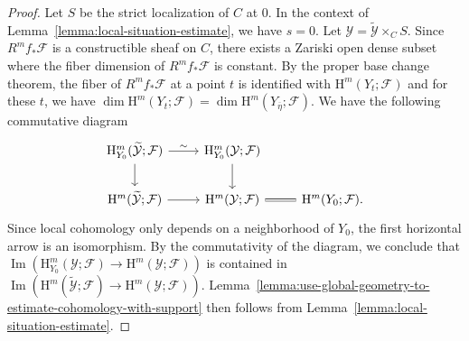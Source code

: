 \documentclass[english]{smfart}
\theoremstyle{remark}
\theoremstyle{plain}
\theoremstyle{definition}
\numberwithin{equation}{remark}
\theoremstyle{void}
\begin{document}
\begin{proof}
Let \(S\) be the strict localization of \(C\) at \(0\).  In the
context of Lemma~\ref{lemma:local-situation-estimate}, we have
\(s = 0\).  Let \(\mathcal{Y} = \widetilde{\mathcal{Y}}\times_{C} S\).  Since
\(R^{m}f_{\ast}\mathcal{F}\) is a constructible sheaf on \(C\), there
exists a Zariski open dense subset where the fiber dimension of
\(R^{m}f_{\ast}\mathcal{F}\) is constant.  By the proper base change
theorem, the fiber of \(R^{m}f_{\ast}\mathcal{F}\) at a point \(t\) is
identified with \(\mathrm{H}^m(Y_{t};\mathcal{F})\) and for these \(t\), we have
\(\dim\mathrm{H}^m(Y_t;\mathcal{F})=\dim\mathrm{H}^m(Y_{\overline{\eta}};\mathcal{F})\).
We have the following commutative diagram
\begin{equation*}
\begin{tikzcd}
\mathrm{H}^m_{Y_{0}}(\widetilde{\mathcal{Y}};\mathcal{F}) \ar[r,"\sim"] \ar[d] & \mathrm{H}^m_{Y_0}(\mathcal{Y};\mathcal{F}) \ar[d] \\
\mathrm{H}^m(\widetilde{\mathcal{Y}};\mathcal{F}) \ar[r] & \mathrm{H}^m(\mathcal{Y};\mathcal{F}) \ar[r,equal] & \mathrm{H}^m(Y_{0};\mathcal{F}).
\end{tikzcd}
\end{equation*}
Since local cohomology only depends on a neighborhood of \(Y_0\),
the first horizontal arrow is an isomorphism.  By the commutativity
of the diagram, we conclude that
\(\operatorname{Im}(\mathrm{H}^m_{Y_0}(\mathcal{Y};\mathcal{F}) \to \mathrm{H}^m(\mathcal{Y};\mathcal{F}))\) is
contained in
\(\operatorname{Im}(\mathrm{H}^m(\widetilde{\mathcal{Y}};\mathcal{F})\to\mathrm{H}^m(\mathcal{Y};\mathcal{F}))\).
Lemma~\ref{lemma:use-global-geometry-to-estimate-cohomology-with-support}
then follows from Lemma~\ref{lemma:local-situation-estimate}.
\end{proof}
\end{document}
